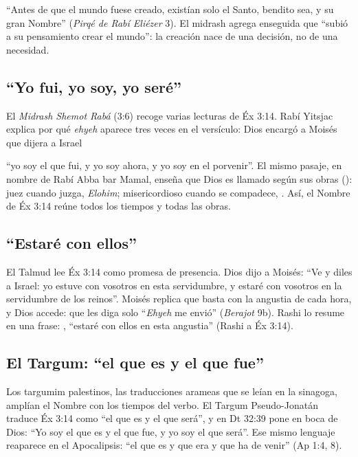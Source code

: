 ``Antes de que el mundo fuese creado, existían solo el Santo, bendito sea, y su gran Nombre'' (\emph{Pirqé de Rabí Eliézer} 3). El midrash agrega enseguida que ``subió a su pensamiento crear el mundo'': la creación nace de una decisión, no de una necesidad.


\subsection{“Yo fui, yo soy, yo seré”}
El \emph{Midrash Shemot Rabá} (3:6) recoge varias lecturas de Éx 3:14. Rabí Yitsjac explica por qué \emph{ehyeh} aparece tres veces en el versículo: Dios encargó a Moisés que dijera a Israel


``yo soy el que fui, y yo soy ahora, y yo soy en el porvenir''. El mismo pasaje, en nombre de Rabí Abba bar Mamal, enseña que Dios es llamado según sus obras (): juez cuando juzga, \emph{Elohim}; misericordioso cuando se compadece, \SENOR. Así, el Nombre de Éx 3:14 reúne todos los tiempos y todas las obras.

\subsection{“Estaré con ellos”}
El Talmud lee Éx 3:14 como promesa de presencia. Dios dijo a Moisés: ``Ve y diles a Israel: yo estuve con vosotros en esta servidumbre, y estaré con vosotros en la servidumbre de los reinos''. Moisés replica que basta con la angustia de cada hora, y Dios accede: que les diga solo ``\emph{Ehyeh} me envió'' (\emph{Berajot} 9b). Rashi lo resume en una frase: , ``estaré con ellos en esta angustia'' (Rashi a Éx 3:14).


\subsection{El Targum: “el que es y el que fue”}
Los targumim palestinos, las traducciones arameas que se leían en la sinagoga, amplían el Nombre con los tiempos del verbo. El Targum Pseudo-Jonatán traduce Éx 3:14 como ``el que es y el que será'', y en Dt 32:39 pone en boca de Dios: ``Yo soy el que es y el que fue, y yo soy el que será''. Ese mismo lenguaje reaparece en el Apocalipsis: ``el que es y que era y que ha de venir'' (Ap 1:4, 8).

